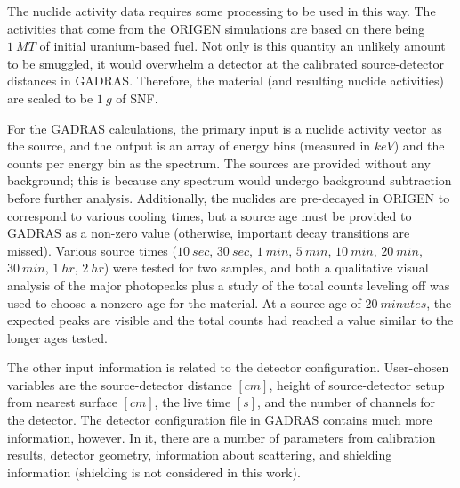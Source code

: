 The nuclide activity data requires some processing to be used in this way.  The
activities that come from the \gls{ORIGEN} simulations are based on there being
$1\:MT$ of initial uranium-based fuel. Not only is this quantity an unlikely
amount to be smuggled, it would overwhelm a detector at the calibrated
source-detector distances in \gls{GADRAS}.  Therefore, the material (and
resulting nuclide activities) are scaled to be $1\:g$ of \gls{SNF}.

For the \gls{GADRAS} calculations, the primary input is a nuclide activity
vector as the source, and the output is an array of energy bins (measured in
$keV$) and the counts per energy bin as the spectrum.  The sources are provided
without any background; this is because any spectrum would undergo background
subtraction before further analysis. Additionally, the nuclides are pre-decayed
in \gls{ORIGEN} to correspond to various cooling times, but a source age must
be provided to \gls{GADRAS} as a non-zero value (otherwise, important decay
transitions are missed). Various source times ($10\:sec$, $30\:sec$, $1\:min$,
$5\:min$, $10\:min$, $20\:min$, $30\:min$, $1\:hr$, $2\:hr$) were tested for
two samples, and both a qualitative visual analysis of the major photopeaks
plus a study of the total counts leveling off was used to choose a nonzero age
for the material.  At a source age of $20\:minutes$, the expected peaks are
visible and the total counts had reached a value similar to the longer ages
tested.

The other input information is related to the detector configuration.
User-chosen variables are the source-detector distance $[cm]$, height of
source-detector setup from nearest surface $[cm]$, the live time $[s]$, and the
number of channels for the detector. The detector configuration file in
\gls{GADRAS} contains much more information, however.  In it, there are a
number of parameters from calibration results, detector geometry, information
about scattering, and shielding information (shielding is not considered in
this work).

